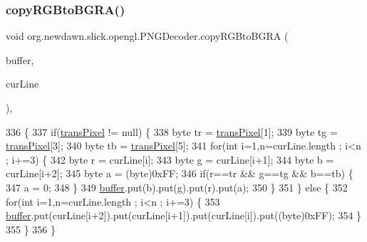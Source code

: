 \subsubsection{\texorpdfstring{copy\+R\+G\+Bto\+B\+G\+R\+A()}{copyRGBtoBGRA()}}
{\footnotesize\ttfamily void org.\+newdawn.\+slick.\+opengl.\+P\+N\+G\+Decoder.\+copy\+R\+G\+Bto\+B\+G\+RA (\begin{DoxyParamCaption}\item[{Byte\+Buffer}]{buffer,  }\item[{byte \mbox{[}$\,$\mbox{]}}]{cur\+Line }\end{DoxyParamCaption})\hspace{0.3cm}{\ttfamily [inline]}, {\ttfamily [private]}}


\begin{DoxyCode}
336                                                                   \{
337         \textcolor{keywordflow}{if}(\mbox{\hyperlink{classorg_1_1newdawn_1_1slick_1_1opengl_1_1_p_n_g_decoder_ad3c546cf013c0c8bdee84a07fdc08389}{transPixel}} != null) \{
338             byte tr = \mbox{\hyperlink{classorg_1_1newdawn_1_1slick_1_1opengl_1_1_p_n_g_decoder_ad3c546cf013c0c8bdee84a07fdc08389}{transPixel}}[1];
339             byte tg = \mbox{\hyperlink{classorg_1_1newdawn_1_1slick_1_1opengl_1_1_p_n_g_decoder_ad3c546cf013c0c8bdee84a07fdc08389}{transPixel}}[3];
340             byte tb = \mbox{\hyperlink{classorg_1_1newdawn_1_1slick_1_1opengl_1_1_p_n_g_decoder_ad3c546cf013c0c8bdee84a07fdc08389}{transPixel}}[5];
341             \textcolor{keywordflow}{for}(\textcolor{keywordtype}{int} i=1,n=curLine.length ; i<n ; i+=3) \{
342                 byte r = curLine[i];
343                 byte g = curLine[i+1];
344                 byte b = curLine[i+2];
345                 byte a = (byte)0xFF;
346                 \textcolor{keywordflow}{if}(r==tr && g==tg && b==tb) \{
347                     a = 0;
348                 \}
349                 \mbox{\hyperlink{classorg_1_1newdawn_1_1slick_1_1opengl_1_1_p_n_g_decoder_ae205f9222586a2bc01a8a240c5c210ad}{buffer}}.put(b).put(g).put(r).put(a);
350             \}
351         \} \textcolor{keywordflow}{else} \{
352             \textcolor{keywordflow}{for}(\textcolor{keywordtype}{int} i=1,n=curLine.length ; i<n ; i+=3) \{
353                 \mbox{\hyperlink{classorg_1_1newdawn_1_1slick_1_1opengl_1_1_p_n_g_decoder_ae205f9222586a2bc01a8a240c5c210ad}{buffer}}.put(curLine[i+2]).put(curLine[i+1]).put(curLine[i]).put((byte)0xFF);
354             \}
355         \}
356     \}
\end{DoxyCode}
\mbox{\label{classorg_1_1newdawn_1_1slick_1_1opengl_1_1_p_n_g_decoder_a02412286c8a28c2dedcbf64948b727ee}} 
